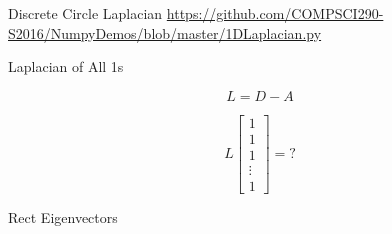 \documentclass{beamer}
\begin{document}
\begin{frame}{Discrete Circle Laplacian}
\tiny \url{https://github.com/COMPSCI290-S2016/NumpyDemos/blob/master/1DLaplacian.py}
\end{frame}


\begin{frame}{Laplacian of All 1s}

\[ L = D - A \]

\[ L \left[ \begin{array}{c} 1 \\ 1 \\ 1 \\ \vdots \\ 1 \end{array} \right] = ? \]

\end{frame}


\begin{frame}{Rect Eigenvectors}


\end{frame}
\end{document}
